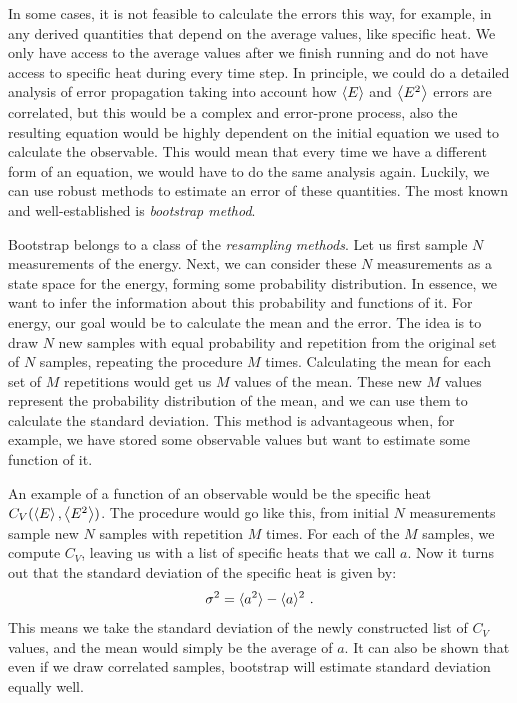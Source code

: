 \par
In some cases, it is not feasible to calculate the errors this way, for example, in any derived quantities that depend on the average values, like specific heat. We only have access to the average values after we finish running and do not have access to specific heat during every time step. In principle, we could do a detailed analysis of error propagation taking into account how $\expval{E}$ and $\expval{E^2}$ errors are correlated, but this would be a complex and error-prone process, also the resulting equation would be highly dependent on the initial equation we used to calculate the observable. This would mean that every time we have a different form of an equation, we would have to do the same analysis again. Luckily, we can use robust methods to estimate an error of these quantities. The most known and well-established is \textit{bootstrap method}.
\par
Bootstrap belongs to a class of the \textit{resampling methods}. Let us first sample $N$ measurements of the energy. Next, we can consider these $N$ measurements as a state space for the energy, forming some probability distribution. In essence, we want to infer the information about this probability and functions of it. For energy, our goal would be to calculate the mean and the error. The idea is to draw $N$ new samples with equal probability and repetition from the original set of $N$ samples, repeating the procedure $M$ times. Calculating the mean for each set of $M$ repetitions would get us $M$ values of the mean. These new $M$ values represent the probability distribution of the mean, and we can use them to calculate the standard deviation. This method is advantageous when, for example, we have stored some observable values but want to estimate some function of it. 
\par
An example of a function of an observable would be the specific heat $C_V(\expval{E}, \expval{E^2})$. The procedure would go like this, from initial $N$ measurements sample new $N$ samples with repetition $M$ times. For each of the $M$ samples, we compute $C_V$, leaving us with a list of specific heats that we call $a$. Now it turns out that the standard deviation of the specific heat is given by\cite{newman1999monte}:
\begin{equation}
	\sigma^2 = \langle a^2 \rangle - \langle a \rangle^2 \ .
\end{equation}
This means we take the standard deviation of the newly constructed list of $C_V$ values, and the mean would simply be the average of $a$. It can also be shown that even if we draw correlated samples, bootstrap will estimate standard deviation equally well. 
